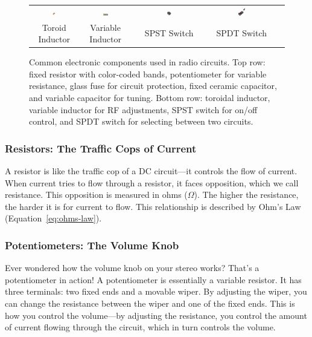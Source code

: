 \begin{figure}[h!]
\begin{tabular}{ccccc}
        \includegraphics[width=0.11\textwidth]{tech/images/inductor} &
        \includegraphics[width=0.11\textwidth]{tech/images/variable-inductor} &
        \includegraphics[width=0.11\textwidth]{tech/images/spst} &
        \includegraphics[width=0.11\textwidth]{tech/images/spdt} & \\
        Toroid Inductor & Variable Inductor & SPST Switch & SPDT Switch & \\
    \end{tabular}
    \caption{Common electronic components used in radio circuits. Top row: fixed resistor with color-coded bands, potentiometer for variable resistance, glass fuse for circuit protection, fixed ceramic capacitor, and variable capacitor for tuning. Bottom row: toroidal inductor, variable inductor for RF adjustments, SPST switch for on/off control, and SPDT switch for selecting between two circuits.}
    \label{fig:component-photos}
\end{figure}


\subsubsection*{Resistors: The Traffic Cops of Current}
A resistor is like the traffic cop of a DC circuit—it controls the flow of current. When current tries to flow through a resistor, it faces opposition, which we call resistance. This opposition is measured in ohms ($\Omega$). The higher the resistance, the harder it is for current to flow. This relationship is described by Ohm's Law (Equation~\ref{eq:ohms-law}).

\subsubsection*{Potentiometers: The Volume Knob}
Ever wondered how the volume knob on your stereo works? That's a potentiometer in action! A potentiometer is essentially a variable resistor. It has three terminals: two fixed ends and a movable wiper. By adjusting the wiper, you can change the resistance between the wiper and one of the fixed ends. This is how you control the volume—by adjusting the resistance, you control the amount of current flowing through the circuit, which in turn controls the volume.

